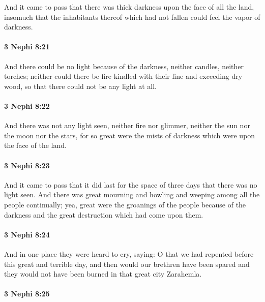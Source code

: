 			And it came to pass that there was thick darkness upon the face of all the land,
			insomuch that the inhabitants thereof which had not fallen
			could feel the vapor of darkness.

		\paragraph{3 Nephi 8:21} %
			\label{3NEPHI-8-21}

			And there could be no light because of the darkness,
			neither candles, neither torches;
			neither could there be fire kindled with their fine and exceeding dry wood,
			so that there could not be any light at all.

		\paragraph{3 Nephi 8:22} %
			\label{3NEPHI-8-22}

			And there was not any light seen,
			neither fire nor glimmer,
			neither the sun nor the moon nor the stars,
			for so great were the mists of darkness
			which were upon the face of the land.

		\paragraph{3 Nephi 8:23} %
			\label{3NEPHI-8-23}

			And it came to pass that it did last for the space of three days
			that there was no light seen.
			And there was great mourning and howling and weeping
			among all the people continually;
			yea, great were the groanings of the people
			because of the darkness and the great destruction
			which had come upon them.

		\paragraph{3 Nephi 8:24} %
			\label{3NEPHI-8-24}

			And in one place they were heard to cry, saying:
			O that we had repented before this great and terrible day,
			and then would our brethren have been spared
			and they would not have been burned in that great city Zarahemla.

		\paragraph{3 Nephi 8:25} %
			\label{3NEPHI-8-25}

